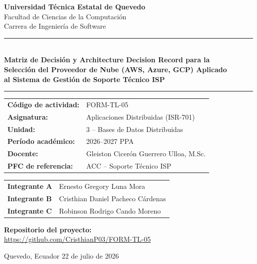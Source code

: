 \documentclass[12pt, a4paper]{article}
\begin{document}
\begin{titlepage}
\centering
\vspace*{0.2cm}
{\large\bfseries Universidad Técnica Estatal de Quevedo}\\[4pt]
{\normalsize Facultad de Ciencias de la Computación}\\[2pt]
{\normalsize Carrera de Ingeniería de Software}
\vspace{0.5cm}
\rule{\linewidth}{1pt}\\[6pt]
{\Large\bfseries
  Matriz de Decisión y Architecture Decision Record para la\\[2pt]
  Selección del Proveedor de Nube (AWS, Azure, GCP) Aplicado\\[2pt]
  al Sistema de Gestión de Soporte Técnico ISP
}
\vspace{2pt}
\rule{\linewidth}{1pt}
\vspace{0.5cm}

{\small
\begin{tabular}{@{}ll@{}}
\textbf{Código de actividad:} & FORM-TL-05 \\[2pt]
\textbf{Asignatura:} & Aplicaciones Distribuidas (ISR-701) \\[2pt]
\textbf{Unidad:} & 3 -- Bases de Datos Distribuidas \\[2pt]
\textbf{Período académico:} & 2026--2027 PPA \\[2pt]
\textbf{Docente:} & Gleiston Cicerón Guerrero Ulloa, M.Sc. \\[2pt]
\textbf{PFC de referencia:} & ACC -- Soporte Técnico ISP \\
\end{tabular}
}

\vspace{0.5cm}
\par\noindent
{\small
\begin{tabular}{@{}ll@{}}
\textbf{Integrante A} & Ernesto Gregory Luna Mora \\[2pt]
\textbf{Integrante B} & Cristhian Daniel Pacheco Cárdenas \\[2pt]
\textbf{Integrante C} & Robinson Rodrigo Cando Moreno \\
\end{tabular}
}
\par
\vspace{0.6cm}
\par\noindent
{\small
  \textbf{Repositorio del proyecto:}\\[3pt]
  \url{https://github.com/CristhianP03/FORM-TL-05}
}
\par

\vfill
{\small Quevedo, Ecuador \textperiodcentered{} 22 de julio de 2026}
\end{titlepage}
\end{document}
